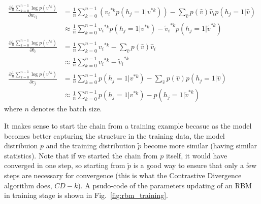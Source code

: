 \documentclass[runningheads,openany]{xhlPaper}
\begin{document}
\begin{equation}
\label{equ:dbn_rbm_drawn_approximation_batch}
\begin{aligned}
\frac{{\partial \frac{1}{n}\sum\limits_{k = 0}^{n - 1} {\log p\left( {{v^{*k}}} \right)} }}{{\partial {w_{ij}}}} &= \frac{1}{n}\sum\limits_{k = 0}^{n - 1} {\left( {{v_i}^{*k}p\left( {{h_j} = 1|{v^{*k}}} \right)} \right)}  - \sum\limits_{\hat v} {p\left( {\hat v} \right){{\hat v}_i}p\left( {{h_j} = 1|\hat v} \right)} \\
 &\approx \frac{1}{n}\sum\limits_{k = 0}^{n - 1} {{v_i}^{*k}p\left( {{h_j} = 1|{v^{*k}}} \right) - {{\tilde v}_i}^{*k}p\left( {{h_j} = 1|{{\tilde v}^{*k}}} \right)} \\
\frac{{\partial \frac{1}{n}\sum\limits_{k = 0}^{n - 1} {\log p\left( {{v^{*k}}} \right)} }}{{\partial {b_i}}} &= \frac{1}{n}\sum\limits_{k = 0}^{n - 1} {{v_i}^{*k}}  - \sum\limits_{\hat v} {p\left( {\hat v} \right){{\hat v}_i}} \\
 &\approx \frac{1}{n}\sum\limits_{k = 0}^{n - 1} {{v_i}^{*k} - {{\tilde v}_i}^{*k}} \\
\frac{{\partial \frac{1}{n}\sum\limits_{k = 0}^{n - 1} {\log p\left( {{v^{*k}}} \right)} }}{{\partial {c_j}}} &= \frac{1}{n}\sum\limits_{k = 0}^{n - 1} {p\left( {{h_j} = 1|{v^{*k}}} \right)}  - \sum\limits_{\hat v} {p\left( {\hat v} \right)p\left( {{h_j} = 1|\hat v} \right)} \\
 &\approx \frac{1}{n}\sum\limits_{k = 0}^{n - 1} {p\left( {{h_j} = 1|{v^{*k}}} \right) - p\left( {{h_j} = 1|{{\tilde v}^{*k}}} \right)} 
\end{aligned}
\end{equation}
where $n$ denotes the batch size.

It makes sense to start the chain from a training example becasue as the model becomes better capturing the structure in the training data, the model distribuion $p$ and the training distribution $\tilde{p}$ become more similar (having similar statistics).
Note that if we started the chain from $p$ itself, it would have converged in one step, so starting from $\tilde{p}$ is a good way to ensure that only a few steps are necessary for convergence (this is what the Contrastive Divergence algorithm does, $CD-k$).
A psudo-code of the parameters updating of an RBM in training stage is shown in Fig.~\ref{fig:rbm_training}.
\end{document}
